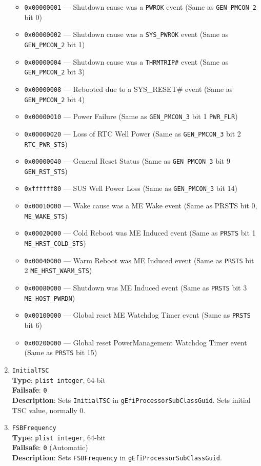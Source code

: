 \documentclass[]{article}
\providecommand{\tightlist}{%
  \setlength{\itemsep}{0pt}\setlength{\parskip}{0pt}}
\begin{document}
\begin{enumerate}
  \begin{itemize}
  \tightlist
  \item
    \texttt{0x00000001} --- Shutdown cause was a \texttt{PWROK} event
    (Same as \texttt{GEN\_PMCON\_2} bit 0)
  \item
    \texttt{0x00000002} --- Shutdown cause was a \texttt{SYS\_PWROK}
    event (Same as \texttt{GEN\_PMCON\_2} bit 1)
  \item
    \texttt{0x00000004} --- Shutdown cause was a \texttt{THRMTRIP\#}
    event (Same as \texttt{GEN\_PMCON\_2} bit 3)
  \item
    \texttt{0x00000008} --- Rebooted due to a SYS\_RESET\# event (Same
    as \texttt{GEN\_PMCON\_2} bit 4)
  \item
    \texttt{0x00000010} --- Power Failure (Same as
    \texttt{GEN\_PMCON\_3} bit 1 \texttt{PWR\_FLR})
  \item
    \texttt{0x00000020} --- Loss of RTC Well Power (Same as
    \texttt{GEN\_PMCON\_3} bit 2 \texttt{RTC\_PWR\_STS})
  \item
    \texttt{0x00000040} --- General Reset Status (Same as
    \texttt{GEN\_PMCON\_3} bit 9 \texttt{GEN\_RST\_STS})
  \item
    \texttt{0xffffff80} --- SUS Well Power Loss (Same as
    \texttt{GEN\_PMCON\_3} bit 14)
  \item
    \texttt{0x00010000} --- Wake cause was a ME Wake event (Same as
    PRSTS bit 0, \texttt{ME\_WAKE\_STS})
  \item
    \texttt{0x00020000} --- Cold Reboot was ME Induced event (Same as
    \texttt{PRSTS} bit 1 \texttt{ME\_HRST\_COLD\_STS})
  \item
    \texttt{0x00040000} --- Warm Reboot was ME Induced event (Same as
    \texttt{PRSTS} bit 2 \texttt{ME\_HRST\_WARM\_STS})
  \item
    \texttt{0x00080000} --- Shutdown was ME Induced event (Same as
    \texttt{PRSTS} bit 3 \texttt{ME\_HOST\_PWRDN})
  \item
    \texttt{0x00100000} --- Global reset ME Watchdog Timer event (Same as
    \texttt{PRSTS} bit 6)
  \item
    \texttt{0x00200000} --- Global reset PowerManagement Watchdog Timer
    event (Same as \texttt{PRSTS} bit 15)
  \end{itemize}
\item
  \texttt{InitialTSC}\\
  \textbf{Type}: \texttt{plist\ integer}, 64-bit\\
  \textbf{Failsafe}: \texttt{0}\\
  \textbf{Description}: Sets \texttt{InitialTSC} in
  \texttt{gEfiProcessorSubClassGuid}. Sets initial TSC value, normally
  0.
\item
  \texttt{FSBFrequency}\\
  \textbf{Type}: \texttt{plist\ integer}, 64-bit\\
  \textbf{Failsafe}: \texttt{0} (Automatic)\\
  \textbf{Description}: Sets \texttt{FSBFrequency} in
  \texttt{gEfiProcessorSubClassGuid}.


\end{enumerate}
\end{document}
